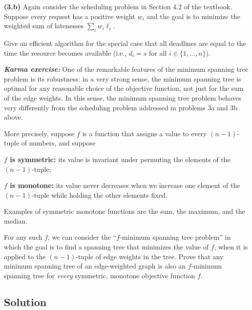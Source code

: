 \documentclass[12pt]{article}
\begin{document}
\textbf{(3.b)}
Again consider the scheduling problem in Section 4.2 of the textbook.
Suppose every request has a positive weight $w_i$ and the goal
is to minimize the weighted sum of latenesses $\sum_i w_i \ell_i$.

Give an efficient algorithm for the special case that all deadlines
are equal to the time the resource becomes available (i.e., $d_i=s$ for
all $i\in \{1,\ldots,n\}$).

\medskip

\emph{\textbf{Karma exercise:}} One of the remarkable features of the
minimum spanning tree problem is its robustness: in a very strong
sense, the minimum spanning tree is optimal for any reasonable
choice of the objective function, not just for the sum of the
edge weights. In this sense, the minimum spanning tree problem behaves
very differently from the scheduling problem addressed in problems
3a and 3b above.

More precisely, suppose $f$ is a function that
assigns a value to every $(n-1)$-tuple of numbers, and suppose
\begin{compactitem}
\item {\bf $f$ is symmetric:} its value is invariant under
permuting the elements of the $(n-1)$-tuple;
\item {\bf $f$ is monotone:} its value never decreases when we
increase one element of the $(n-1)$-tuple while holding the other elements
fixed.
\end{compactitem}
Examples of symmetric monotone functions are the sum, the maximum,
and the median.

For any such $f$, we can consider the ``$f$-minimum spanning tree problem''
in which the goal is to find a spanning tree that minimizes the value of $f$,
when it is applied to the $(n-1)$-tuple of edge weights in the tree.
Prove that any minimum spanning tree of an edge-weighted graph is also an
$f$-minimum spanning tree for \emph{every} symmetric, monotone
objective function $f$.

\subsection{Solution}
\end{document}
